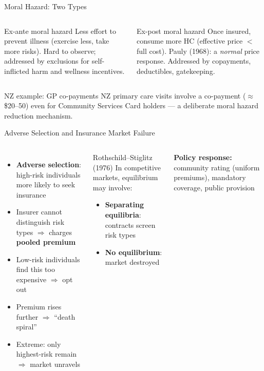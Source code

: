 \documentclass[aspectratio=169, 12pt]{beamer}
\begin{document}
\begin{frame}{Moral Hazard: Two Types}
  \begin{columns}
      \begin{alertblock}{Ex-ante moral hazard}
        \small Less effort to prevent illness (exercise less, take more risks). Hard to observe;
        addressed by exclusions for self-inflicted harm and wellness incentives.
      \end{alertblock}
      \begin{alertblock}{Ex-post moral hazard}
        \small Once insured, consume more HC (effective price $<$ full cost). Pauly (1968): a
        \emph{normal} price response. Addressed by copayments, deductibles, gatekeeping.
      \end{alertblock}
  \end{columns}
  \begin{exampleblock}{NZ example: GP co-payments}
    \small NZ primary care visits involve a co-payment ($\approx$\$20--50) even for Community
    Services Card holders --- a deliberate moral hazard reduction mechanism.
  \end{exampleblock}
\end{frame}

\begin{frame}{Adverse Selection and Insurance Market Failure}
  \begin{columns}
      \small
      \begin{itemize}
        \item \textbf{Adverse selection}: high-risk individuals more likely to seek insurance
        \item Insurer cannot distinguish risk types $\Rightarrow$ charges \textbf{pooled premium}
        \item Low-risk individuals find this too expensive $\Rightarrow$ opt out
        \item Premium rises further $\Rightarrow$ ``death spiral''
        \item Extreme: only highest-risk remain $\Rightarrow$ market unravels
      \end{itemize}
      \begin{alertblock}{Rothschild--Stiglitz (1976)}
        \small In competitive markets, equilibrium may involve:
        \begin{itemize}
          \item \textbf{Separating equilibria}: contracts screen risk types
          \item \textbf{No equilibrium}: market destroyed
        \end{itemize}
      \end{alertblock}
      \small\textbf{Policy response:} community rating (uniform premiums), mandatory coverage,
      public provision
  \end{columns}
\end{frame}
\end{document}
